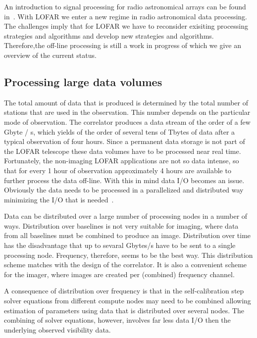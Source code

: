 \documentclass[journal]{IEEEtran}
\begin{document}
An introduction to signal processing for radio astronomical arrays can be found in~\cite{Veen1:04,Veen2:04,Boonstra:05}. With LOFAR we enter a new regime in radio astronomical data processing.  The challenges imply that for LOFAR we have to reconsider exisiting processing strategies and algorithms and develop new strategies and algorithms. Therefore,the off-line processing is still a work in progress of which we give an overview of the current status.
\label{sec:offline}

\subsection{Processing large data volumes}

The total amount of data that is produced is determined by the total number of stations that are used in the observation. This number depends on the particular mode of observation. The correlator produces a data stream of the order of a few Gbyte / s, which yields of the order of several tens of Tbytes of data after a typical observation of four hours. Since a permanent data storage is not part of the LOFAR telescope these data volumes have to be processed near real time. Fortunately, the non-imaging LOFAR applications are not so data intense, so that for every 1 hour of observation approximately 4 hours are available to further process the data off-line. With this in mind data I/O becomes an issue. Obviously the data needs to be processed in a parallelized and distributed way minimizing the I/O that is needed~\cite{Loose:08,Diepen:08}.  
 
Data can be distributed over a large number of processing nodes in a number of ways. Distribution over baselines is not very suitable for imaging, where data from all baselines must be combined to produce an image. Distribution over time has the disadvantage that up to sevaral Gbytes/s have to be sent to a single processing node. Frequency, therefore, seems to be the best way. This distribution scheme matches with the design of the correlator. It is also a convenient scheme for the imager, where images are created per (combined) frequency channel.

A consequence of distribution over frequency is that in the self-calibration step solver equations from different compute nodes may need to be combined allowing estimation of parameters using data that is distributed over several nodes. The combining of solver equations, however, involves far less data I/O then the underlying observed visibility data.   
\end{document}
